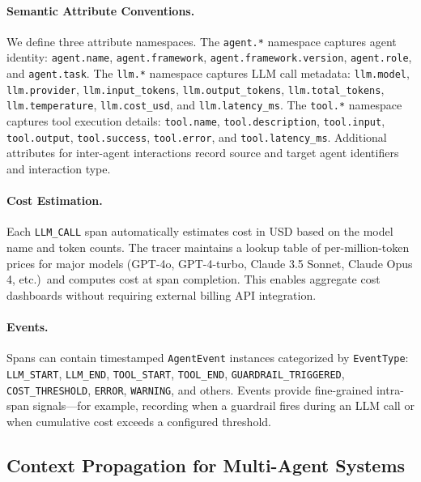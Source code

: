 \documentclass[sigconf,nonacm]{acmart}
\begin{document}
\paragraph{Semantic Attribute Conventions.}
We define three attribute namespaces.  The \texttt{agent.*} namespace
captures agent identity: \texttt{agent.name}, \texttt{agent.framework},
\texttt{agent.framework.version}, \texttt{agent.role}, and
\texttt{agent.task}.  The \texttt{llm.*} namespace captures LLM call
metadata: \texttt{llm.model}, \texttt{llm.provider},
\texttt{llm.input\_tokens}, \texttt{llm.output\_tokens},
\texttt{llm.total\_tokens}, \texttt{llm.temperature},
\texttt{llm.cost\_usd}, and \texttt{llm.latency\_ms}.  The
\texttt{tool.*} namespace captures tool execution details:
\texttt{tool.name}, \texttt{tool.description}, \texttt{tool.input},
\texttt{tool.output}, \texttt{tool.success}, \texttt{tool.error}, and
\texttt{tool.latency\_ms}.  Additional attributes for inter-agent
interactions record source and target agent identifiers and interaction
type.

\paragraph{Cost Estimation.}
Each \texttt{LLM\_CALL} span automatically estimates cost in USD based
on the model name and token counts.  The tracer maintains a lookup table
of per-million-token prices for major models (GPT-4o, GPT-4-turbo,
Claude 3.5 Sonnet, Claude Opus 4, etc.)\ and computes cost at span
completion.  This enables aggregate cost dashboards without requiring
external billing API integration.

\paragraph{Events.}
Spans can contain timestamped \texttt{AgentEvent} instances categorized
by \texttt{EventType}: \texttt{LLM\_START}, \texttt{LLM\_END},
\texttt{TOOL\_START}, \texttt{TOOL\_END}, \texttt{GUARDRAIL\_TRIGGERED},
\texttt{COST\_THRESHOLD}, \texttt{ERROR}, \texttt{WARNING}, and others.
Events provide fine-grained intra-span signals---for example, recording when
a guardrail fires during an LLM call or when cumulative cost exceeds a
configured threshold.

\subsection{Context Propagation for Multi-Agent Systems}
\label{sec:context}
\end{document}
